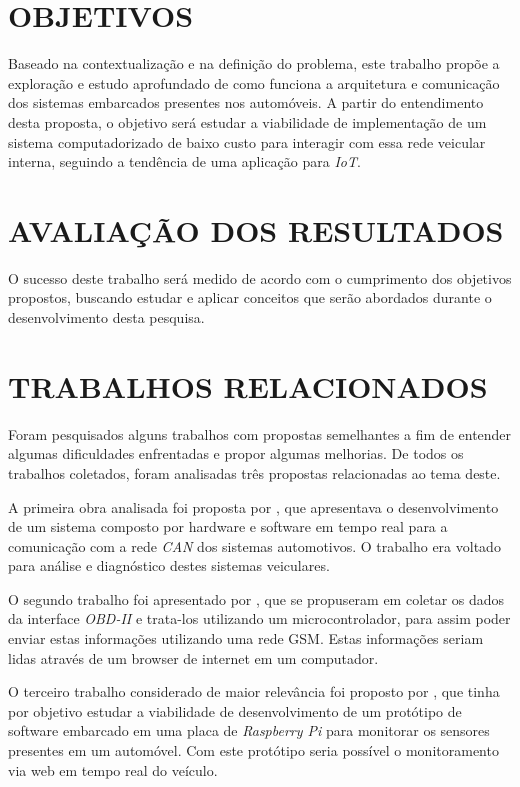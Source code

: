 \section{OBJETIVOS}
Baseado na contextualização e na definição do problema, este trabalho propõe a exploração e estudo aprofundado de como funciona a arquitetura e comunicação dos sistemas embarcados presentes nos automóveis. A partir do entendimento desta proposta, o objetivo será estudar a viabilidade de implementação de um sistema computadorizado de baixo custo para interagir com essa rede veicular interna, seguindo a tendência de uma aplicação para \textit{IoT}.

\section{AVALIAÇÃO DOS RESULTADOS}
O sucesso deste trabalho será medido de acordo com o cumprimento dos objetivos propostos, buscando estudar e aplicar conceitos que serão abordados durante o desenvolvimento desta pesquisa.

\section{TRABALHOS RELACIONADOS}
Foram pesquisados alguns trabalhos com propostas semelhantes a fim de entender algumas dificuldades enfrentadas e propor algumas melhorias. De todos os trabalhos coletados, foram analisadas três propostas relacionadas ao tema deste.

A primeira obra analisada foi proposta por , que apresentava o desenvolvimento de um sistema composto por hardware e software em tempo real para a comunicação com a rede \textit{CAN} dos sistemas automotivos. O trabalho era voltado para análise e diagnóstico destes sistemas veiculares.

O segundo trabalho foi apresentado por , que se propuseram em coletar os dados da interface \textit{OBD-II} e trata-los utilizando um microcontrolador, para assim poder enviar estas informações utilizando uma rede GSM. Estas informações seriam lidas através de um browser de internet em um computador.

O terceiro trabalho considerado de maior relevância foi proposto por , que tinha por objetivo estudar a viabilidade de desenvolvimento de um protótipo de software embarcado em uma placa de \textit{Raspberry Pi} para monitorar os sensores presentes em um automóvel. Com este protótipo seria possível o monitoramento via web em tempo real do veículo.

